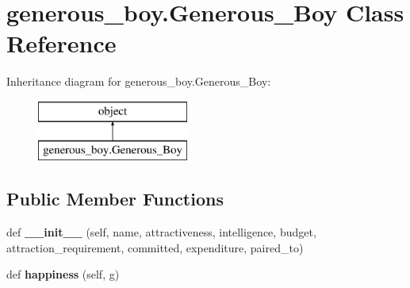 \hypertarget{classgenerous__boy_1_1_generous___boy}{}\section{generous\+\_\+boy.\+Generous\+\_\+\+Boy Class Reference}
\label{classgenerous__boy_1_1_generous___boy}
Inheritance diagram for generous\+\_\+boy.\+Generous\+\_\+\+Boy\+:\begin{figure}[H]
\begin{center}
\leavevmode
\includegraphics[height=2.000000cm]{classgenerous__boy_1_1_generous___boy}
\end{center}
\end{figure}
\subsection*{Public Member Functions}
\begin{DoxyCompactItemize}
\item 
\mbox{\label{classgenerous__boy_1_1_generous___boy_a0b255a2a43d52138254fb384eeb8ca4b}} 
def {\bfseries \+\_\+\+\_\+init\+\_\+\+\_\+} (self, name, attractiveness, intelligence, budget, attraction\+\_\+requirement, committed, expenditure, paired\+\_\+to)
\item 
\mbox{\label{classgenerous__boy_1_1_generous___boy_a0fe95bfe65726fcffdf859b0ae03932f}} 
def {\bfseries happiness} (self, g)
\end{DoxyCompactItemize}
